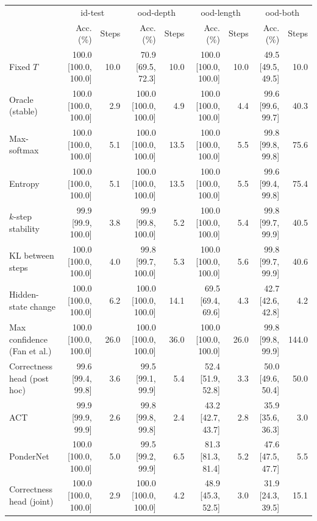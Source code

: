 \begin{tabular}{lrrrrrrrr}
\toprule
 & \multicolumn{2}{c}{id-test} & \multicolumn{2}{c}{ood-depth} & \multicolumn{2}{c}{ood-length} & \multicolumn{2}{c}{ood-both} \\
 & Acc. (\%) & Steps & Acc. (\%) & Steps & Acc. (\%) & Steps & Acc. (\%) & Steps \\
\midrule
Fixed $T$ & 100.0 \tiny{[100.0, 100.0]} & 10.0 & 70.9 \tiny{[69.5, 72.3]} & 10.0 & 100.0 \tiny{[100.0, 100.0]} & 10.0 & 49.5 \tiny{[49.5, 49.5]} & 10.0 \\
Oracle (stable) & 100.0 \tiny{[100.0, 100.0]} & 2.9 & 100.0 \tiny{[100.0, 100.0]} & 4.9 & 100.0 \tiny{[100.0, 100.0]} & 4.4 & 99.6 \tiny{[99.6, 99.7]} & 40.3 \\
\midrule
Max-softmax & 100.0 \tiny{[100.0, 100.0]} & 5.1 & 100.0 \tiny{[100.0, 100.0]} & 13.5 & 100.0 \tiny{[100.0, 100.0]} & 5.5 & 99.8 \tiny{[99.8, 99.8]} & 75.6 \\
Entropy & 100.0 \tiny{[100.0, 100.0]} & 5.1 & 100.0 \tiny{[100.0, 100.0]} & 13.5 & 100.0 \tiny{[100.0, 100.0]} & 5.5 & 99.6 \tiny{[99.4, 99.8]} & 75.4 \\
$k$-step stability & 99.9 \tiny{[99.9, 100.0]} & 3.8 & 99.9 \tiny{[99.8, 100.0]} & 5.2 & 100.0 \tiny{[100.0, 100.0]} & 5.4 & 99.8 \tiny{[99.7, 99.9]} & 40.5 \\
KL between steps & 100.0 \tiny{[100.0, 100.0]} & 4.0 & 99.8 \tiny{[99.7, 100.0]} & 5.3 & 100.0 \tiny{[100.0, 100.0]} & 5.6 & 99.8 \tiny{[99.7, 99.9]} & 40.6 \\
Hidden-state change & 100.0 \tiny{[100.0, 100.0]} & 6.2 & 100.0 \tiny{[100.0, 100.0]} & 14.1 & 69.5 \tiny{[69.4, 69.6]} & 4.3 & 42.7 \tiny{[42.6, 42.8]} & 4.2 \\
Max confidence (Fan et al.) & 100.0 \tiny{[100.0, 100.0]} & 26.0 & 100.0 \tiny{[100.0, 100.0]} & 36.0 & 100.0 \tiny{[100.0, 100.0]} & 26.0 & 99.8 \tiny{[99.8, 99.9]} & 144.0 \\
Correctness head (post hoc) & 99.6 \tiny{[99.4, 99.8]} & 3.6 & 99.5 \tiny{[99.1, 99.9]} & 5.4 & 52.4 \tiny{[51.9, 52.8]} & 3.3 & 50.0 \tiny{[49.6, 50.4]} & 50.0 \\
\midrule
ACT & 99.9 \tiny{[99.9, 99.9]} & 2.6 & 99.8 \tiny{[99.8, 99.8]} & 2.4 & 43.2 \tiny{[42.7, 43.7]} & 2.8 & 35.9 \tiny{[35.6, 36.3]} & 3.0 \\
PonderNet & 100.0 \tiny{[100.0, 100.0]} & 5.0 & 99.5 \tiny{[99.2, 99.9]} & 6.5 & 81.3 \tiny{[81.3, 81.4]} & 5.2 & 47.6 \tiny{[47.5, 47.7]} & 5.5 \\
Correctness head (joint) & 100.0 \tiny{[100.0, 100.0]} & 2.9 & 100.0 \tiny{[100.0, 100.0]} & 4.2 & 48.9 \tiny{[45.3, 52.5]} & 3.0 & 31.9 \tiny{[24.3, 39.5]} & 15.1 \\

\end{tabular}
